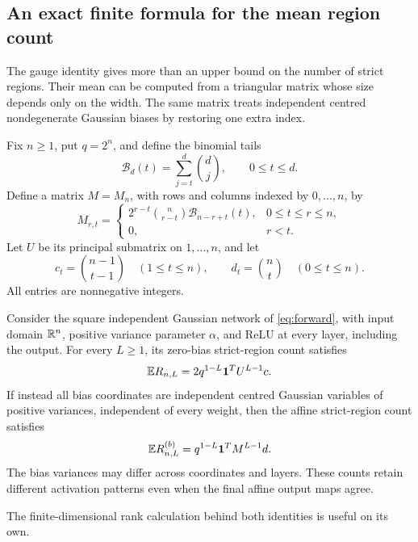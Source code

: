 \subsection{An exact finite formula for the mean region count}
\label{sec:region-transfer}

The gauge identity gives more than an upper bound on the number of strict regions. Their mean can be computed from a triangular matrix whose size depends only on the width. The same matrix treats independent centred nondegenerate Gaussian biases by restoring one extra index.

Fix $n\ge1$, put $q=2^n$, and define the binomial tails
\[
\mathcal B_d(t)=\sum_{j=t}^d\binom dj,\qquad 0\le t\le d.
\]
Define a matrix $M=M_n$, with rows and columns indexed by $0,\ldots,n$, by
\begin{equation}\label{eq:region-transfer-matrix}
M_{r,t}=
\begin{cases}
2^{r-t}\binom n{r-t}\mathcal B_{n-r+t}(t),&0\le t\le r\le n,\\
0,&r<t.
\end{cases}
\end{equation}
Let $U$ be its principal submatrix on $1,\ldots,n$, and let
\[
c_t=\binom{n-1}{t-1}\quad(1\le t\le n),\qquad
d_t=\binom nt\quad(0\le t\le n).
\]
All entries are nonnegative integers.

\begin{theorem}\label{thm:region-transfer}
Consider the square independent Gaussian network of \cref{eq:forward}, with input domain $\mathbb{R}^n$, positive variance parameter $\alpha$, and ReLU at every layer, including the output. For every $L\ge1$, its zero-bias strict-region count satisfies
\begin{equation}\label{eq:region-transfer-zero}
\mathbb{E} R_{n,L}=2q^{1-L}\mathbf{1}^T U^{L-1}c.
\end{equation}
If instead all bias coordinates are independent centred Gaussian variables of positive variances, independent of every weight, then the affine strict-region count satisfies
\begin{equation}\label{eq:region-transfer-affine}
\mathbb{E} R^{(b)}_{n,L}=q^{1-L}\mathbf{1}^T M^{L-1}d.
\end{equation}
The bias variances may differ across coordinates and layers. These counts retain different activation patterns even when the final affine output maps agree.
\end{theorem}

The finite-dimensional rank calculation behind both identities is useful on its own.

